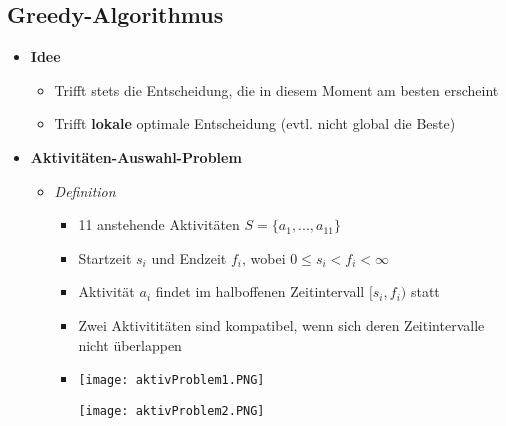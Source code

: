 \subsection{Greedy-Algorithmus}
    \begin{itemize}
        \item \textbf{Idee}
            \begin{itemize}
                \item Trifft stets die Entscheidung, die in diesem Moment am besten erscheint
                \item Trifft \textbf{lokale} optimale Entscheidung (evtl. nicht global die Beste)
            \end{itemize}
        
        \item \textbf{Aktivitäten-Auswahl-Problem}
            \begin{itemize}
                \item \textit{Definition}
                    \begin{itemize}
                        \item 11 anstehende Aktivitäten $S=\{a_1,...,a_{11}\}$
                        \item Startzeit $s_i$ und Endzeit $f_i$, wobei $0 \leq s_i < f_i < \infty$
                        \item Aktivität $a_i$ findet im halboffenen Zeitintervall $[s_i,f_i)$ statt
                        \item Zwei Aktivititäten sind kompatibel, wenn sich deren Zeitintervalle nicht überlappen
                        \item[]
                            \begin{minipage}{0.6\textwidth}
                                \texttt{[image: aktivProblem1.PNG]}
                            \end{minipage}
                            \begin{minipage}{0.3\textwidth}
                                \texttt{[image: aktivProblem2.PNG]}
                            \end{minipage}
                    \end{itemize}
                

\end{itemize}
\end{itemize}

